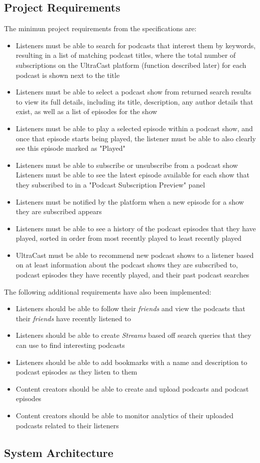 \documentclass[../report.tex]{subfiles}
\begin{document}
\subsection{Project Requirements}
The minimun project requirements from the specifications are:
\begin{itemize}
    \item Listeners must be able to search for podcasts that interest them by keywords, resulting in a list of matching podcast titles, where the total number of subscriptions on the UltraCast platform (function described later) for each podcast is shown next to the title
    \item Listeners must be able to select a podcast show from returned search results to view its full details, including its title, description, any author details that exist, as well as a list of episodes for the show 
    \item Listeners must be able to play a selected episode within a podcast show, and once that episode starts being played, the listener must be able to also clearly see this episode marked as "Played" 
    \item Listeners must be able to subscribe or unsubscribe from a podcast show         Listeners must be able to see the latest episode available for each show that they subscribed to in a "Podcast Subscription Preview" panel
    \item Listeners must be notified by the platform when a new episode for a show  they are subscribed appears
    \item Listeners must be able to see a history of the podcast episodes that they have played, sorted in order from most recently played to least recently played
    \item UltraCast must be able to recommend new podcast shows to a listener based on at least information about the podcast shows they are subscribed to, podcast episodes they have recently played, and their past podcast searches
\end{itemize}
%
The following additional requirements have also been implemented:
\begin{itemize}
    \item Listeners should be able to follow their \textit{friends} and view the podcasts that their \textit{friends} have recently listened to
    \item Listeners should be able to create \textit{Streams} based off search queries that they can use to find interesting podcasts
    \item Listeners should be able to add bookmarks with a name and description to podcast episodes as they listen to them
    \item Content creators should be able to create and upload podcasts and podcast episodes
    \item Content creators should be able to monitor analytics of their uploaded podcasts related to their listeners
\end{itemize}

\subsection{System Architecture}


\end{document}
